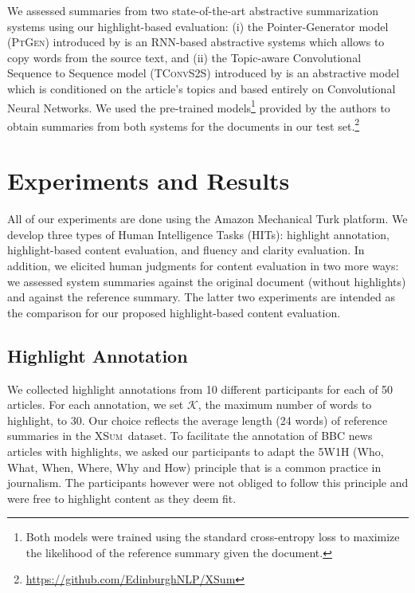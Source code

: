 \documentclass[11pt,a4paper]{article}
\newcommand\highres{\textsc{HighRES}}
\newcommand\ptgen{\textsc{PtGen}}
\newcommand\tconv{\textsc{TConvS2S}}
\newcommand\xsum{\textsc{XSum}}
\begin{document}

We assessed summaries from two state-of-the-art abstractive summarization systems using our highlight-based evaluation: (i) the Pointer-Generator model (\ptgen) introduced by \citet{See2017} is an RNN-based abstractive systems which allows to copy words from the source text, and (ii) the Topic-aware Convolutional Sequence to Sequence model (\tconv) introduced by \citet{narayan18xsum} is an   abstractive model which is conditioned on the article's topics and based entirely on Convolutional Neural Networks.
We used the pre-trained models\footnote{Both models were trained using the standard cross-entropy loss to maximize the likelihood of the reference summary given the document.} provided by the authors to obtain summaries from both systems for the documents in our test set.\footnote{\url{https://github.com/EdinburghNLP/XSum}}


\section{Experiments and Results}
\label{sec:exp-res}

All of our experiments are done using the Amazon Mechanical Turk platform. %
We develop three types of Human Intelligence Tasks (HITs): highlight annotation, highlight-based content evaluation, and fluency and clarity evaluation. In addition, we elicited human
judgments for content evaluation in two more ways: we assessed system summaries against the original document (without highlights) and against the reference summary. 
The latter two experiments are intended as the comparison for our proposed highlight-based content evaluation.

\subsection{Highlight Annotation} 

We collected highlight annotations from 10 different participants for each of 50 articles. For each annotation, we set  $\mathcal{K}$, the maximum number of words to highlight, to 30. Our choice reflects the average length (24 words) of reference summaries in the \xsum\ dataset. To facilitate the annotation of BBC news articles with highlights, we asked our participants to adapt the 5W1H (Who, What, When, Where, Why and How) principle \citep{Robertson1946} that is a common practice in journalism. The participants however were not obliged to follow this principle and were free to highlight content as they deem fit. 
\end{document}
